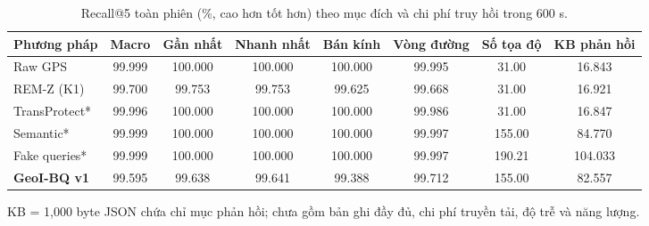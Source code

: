 \begin{table}[t]\centering\footnotesize
\caption{Recall@5 toàn phiên (\%, cao hơn tốt hơn) theo mục đích và chi phí truy hồi trong 600 s.}\label{tab:service}
\begin{tabularx}{\linewidth}{@{}P{2.7cm}CCCCCCC@{}}\toprule
\textbf{Phương pháp} & \textbf{Macro} & \textbf{Gần nhất} & \textbf{Nhanh nhất} & \textbf{Bán kính} & \textbf{Vòng đường} & \textbf{Số tọa độ} & \textbf{KB phản hồi} \\
\midrule
Raw GPS & 99.999 & 100.000 & 100.000 & 100.000 & 99.995 & 31.00 & 16.843 \\
REM-Z (K1) & 99.700 & 99.753 & 99.753 & 99.625 & 99.668 & 31.00 & 16.921 \\
TransProtect* & 99.996 & 100.000 & 100.000 & 100.000 & 99.986 & 31.00 & 16.847 \\
Semantic* & 99.999 & 100.000 & 100.000 & 100.000 & 99.997 & 155.00 & 84.770 \\
Fake queries* & 99.999 & 100.000 & 100.000 & 100.000 & 99.997 & 190.21 & 104.033 \\
\textbf{GeoI-BQ v1} & 99.595 & 99.638 & 99.641 & 99.388 & 99.712 & 155.00 & 82.557 \\
\bottomrule\end{tabularx}
\par\smallskip\raggedright KB = 1,000 byte JSON chứa chỉ mục phản hồi; chưa gồm bản ghi đầy đủ, chi phí truyền tải, độ trễ và năng lượng.
\end{table}
